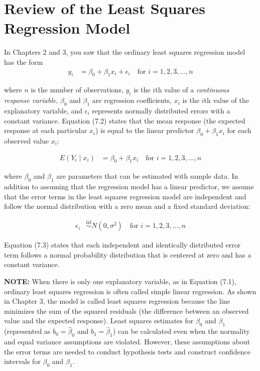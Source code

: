 \documentclass[
]{report}
\begin{document}
\section{\texorpdfstring{\textbf{Review of the Least Squares Regression Model}}{Review of the Least Squares Regression Model}}\label{review-of-the-least-squares-regression-model}

In Chapters 2 and 3, you saw that the ordinary least squares regression model has the form
\begin{align}
y_i &= \beta_0 + \beta_1 x_i + \epsilon_i
\quad\text{for } i = 1, 2, 3, \dots, n
\tag{7.1}
\end{align}

where \(n\) is the number of observations, \(y_i\) is the \(i\)th value of a \textit{continuous response variable}, \(\beta_0\) and \(\beta_1\) are regression coefficients, \(x_i\) is the \(i\)th value of the explanatory variable, and \(\epsilon_i\) represents normally distributed errors with a constant variance. Equation (7.2) states that the mean response (the expected response at each particular \(x_i\)) is equal to the linear predictor \(\beta_0 + \beta_1 x_i\) for each observed value \(x_i\):

\begin{align}
E(Y_i \mid x_i) &= \beta_0 + \beta_1 x_i 
\quad\text{for } i = 1, 2, 3, \dots, n
\tag{7.2}
\end{align}

where \(\beta_0\) and \(\beta_1\) are parameters that can be estimated with sample data. In addition to assuming that the regression model has a linear predictor, we assume that the error terms in the least squares regression model are independent and follow the normal distribution with a zero mean and a fixed standard deviation:

\begin{align}
\epsilon_i &\overset{\mathrm{iid}}{\sim} N(0, \sigma^2) 
\quad\text{for } i = 1, 2, 3, \dots, n
\tag{7.3}
\end{align}

Equation (7.3) states that each independent and identically distributed error term follows a normal probability
distribution that is centered at zero and has a constant variance.

\large

\textbf{NOTE:}
When there is only one explanatory variable, as in Equation (7.1), ordinary least squares regression is often called simple linear regression. As shown in Chapter 3, the model is called least squares regression because the line minimizes the sum of the squared residuals (the difference between an observed value and the expected response). Least squares estimates for \(\beta_0\) and \(\beta_1\) (represented as \(b_0 = \hat\beta_0\) and \(b_1 = \hat\beta_1\)) can be calculated even when the normality and equal variance assumptions are violated. However, these assumptions about the error terms are needed to conduct hypothesis tests and construct confidence intervals for \(\beta_0\) and \(\beta_1\).
\normalsize
\end{document}
